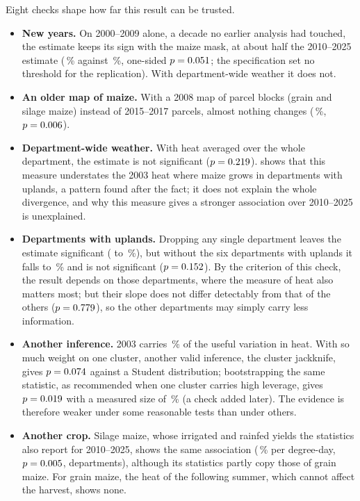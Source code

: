 Eight checks shape how far this result can be trusted.
\begin{itemize}
  \item \textbf{New years.} On 2000--2009 alone, a decade no earlier analysis had touched, the estimate keeps its sign with the maize mask, at about half the 2010--2025 estimate (\QoneReplPct\,\% against \QoneRecentPct\,\%, one-sided $p = 0.051$; the specification set no threshold for the replication). With department-wide weather it does not.
  \item \textbf{An older map of maize.} With a 2008 map of parcel blocks (grain and silage maize) instead of 2015--2017 parcels, almost nothing changes (\QoneMaskPct\,\%, $p = 0.006$).
  \item \textbf{Department-wide weather.} With heat averaged over the whole department, the estimate is not significant ($p = 0.219$).  shows that this measure understates the 2003 heat where maize grows in departments with uplands, a pattern found after the fact; it does not explain the whole divergence, and why this measure gives a stronger association over 2010--2025 is unexplained.
  \item \textbf{Departments with uplands.} Dropping any single department leaves the estimate significant (\LooMinPct{} to \LooMaxPct\,\%), but without the six departments with uplands it falls to \NoReliefPct\,\% and is not significant ($p = 0.152$). By the criterion of this check, the result depends on those departments, where the measure of heat also matters most; but their slope does not differ detectably from that of the others ($p = 0.779$), so the other departments may simply carry less information.
  \item \textbf{Another inference.} 2003 carries \LevThree\,\% of the useful variation in heat. With so much weight on one cluster, another valid inference, the cluster jackknife, gives $p = 0.074$ against a Student distribution; bootstrapping the same statistic, as recommended when one cluster carries high leverage, gives $p = 0.019$ with a measured size of \CvBootSize\,\% (a check added later). The evidence is therefore weaker under some reasonable tests than under others.
  \item \textbf{Another crop.} Silage maize, whose irrigated and rainfed yields the statistics also report for 2010--2025, shows the same association (\FodderPct\,\% per degree-day, $p = 0.005$, \FodderDeps{} departments), although its statistics partly copy those of grain maize. For grain maize, the heat of the following summer, which cannot affect the harvest, shows none.

\end{itemize}
